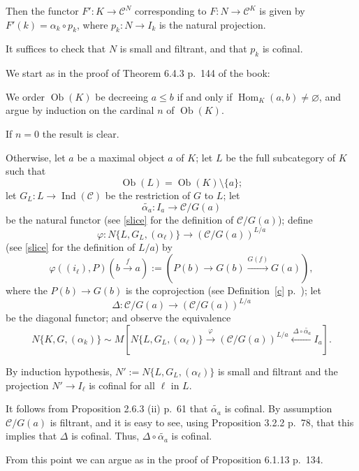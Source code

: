 \documentclass[12pt]{article}
\theoremstyle{remark}
\theoremstyle{definition}
\newcommand{\C}{\mathcal C}
\newcommand{\xr}{\xrightarrow}
\DeclareMathOperator{\Hom}{Hom}%
\DeclareMathOperator{\Ind}{Ind}
\DeclareMathOperator{\Ob}{Ob}
\begin{document}
Then the functor $F':K\to\C^N$ corresponding to $F:N\to\C^K$ is given by $F'(k)=\alpha_k\circ p_k$, where $p_k:N\to I_k$ is the natural projection. 

It suffices to check that $N$ is small and filtrant, and that $p_k$ is cofinal. 

We start as in the proof of Theorem 6.4.3 p.~144 of the book: 

We order $\Ob(K)$ be decreeing $a\le b$ if and only if $\Hom_K(a,b)\neq\varnothing$, and argue by induction on the cardinal $n$ of $\Ob(K)$. 

If $n=0$ the result is clear.

Otherwise, let $a$ be a maximal object $a$ of $K$; let $L$ be the full subcategory of $K$ such that 
$$
\Ob(L)=\Ob(K)\setminus\{a\};
$$ 
let $G_L:L\to\Ind(\C)$ be the restriction of $G$ to $L$; let 
$$
\widetilde{\alpha_a}:I_a\to\C/G(a)
$$ 
be the natural functor (see \eqref{slice} for the definition of $\C/G(a)$); define 
$$ 
\varphi:N\{L,G_L,(\alpha_\ell)\}\to(\C/G(a))^{L/a} 
$$ 
(see \eqref{slice} for the definition of $L/a$) by 
$$
\varphi((i_\ell),P)\left(b\xr f a\right):=\left(P(b)\to G(b)\xr{G(f)}G(a)\right),
$$
where the $P(b)\to G(b)$ is the coprojection (see Definition~\ref{c} p.~\pageref{c}); let 
$$
\Delta:\C/G(a)\to(\C/G(a))^{L/a}
$$ 
be the diagonal functor; and observe the equivalence 
$$ 
N\{K,G,(\alpha_k)\}\sim M\left[N\{L,G_L,(\alpha_\ell)\}\xrightarrow{\varphi}(\C/G(a))^{L/a}\xleftarrow{\ \Delta\circ\widetilde{\alpha_a}}I_a\right]. 
$$ 

By induction hypothesis, $N':=N\{L,G_L,(\alpha_\ell)\}$ is small and filtrant and the projection $N'\to I_\ell$ is cofinal for all $\ell$ in $L$. 

It follows from Proposition 2.6.3 (ii) p.~61 that $\widetilde{\alpha_a}$ is cofinal. By assumption $\C/G(a)$ is filtrant, and it is easy to see, using Proposition 3.2.2 p.~78, that this implies that $\Delta$ is cofinal. Thus, $\Delta\circ\widetilde{\alpha_a}$ is cofinal.

From this point we can argue as in the proof of Proposition 6.1.13 p.~134.
%
%
\end{document}
